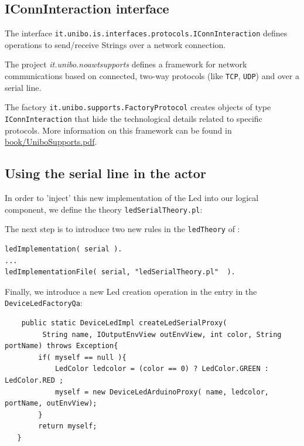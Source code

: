 \subsection{IConnInteraction interface} 
The interface \texttt{it.unibo.is.interfaces.protocols.IConnInteraction} defines operations to send/receive Strings over a  network connection.



The project \textit{it.unibo.noawtsupports} defines a framework for network communications based on connected, two-way protocols (like \texttt{TCP}, \texttt{UDP}) and over a serial line.

The factory \texttt{it.unibo.supports.FactoryProtocol} creates objects of type \texttt{IConnInteraction} that hide the technological details related to specific protocols.  More information on this framework can be found in \href{https://137.204.107.21/syskb/it.unibo.iss2015intro/docs/Readings/UniboSupports/UniboSupports.pdf}{book/UniboSupports.pdf}.

\subsection{Using the serial line in the actor}
In order to 'inject' this new implementation of the Led into our logical component, we define the theory \texttt{ledSerialTheory.pl}:



The next step is to introduce two new rules in  the \texttt{ledTheory} of :

\begin{lstlisting}
ledImplementation( serial ).
...
ledImplementationFile( serial, "ledSerialTheory.pl"  ).
\end{lstlisting}

Finally, we introduce a new Led creation operation in the entry in the \texttt{DeviceLedFactoryQa}:
\begin{lstlisting}
    public static DeviceLedImpl createLedSerialProxy( 
   		 String name, IOutputEnvView outEnvView, int color, String portName) throws Exception{
       	if( myself == null ){
       		LedColor ledcolor = (color == 0) ? LedColor.GREEN : LedColor.RED ;
 	  		myself = new DeviceLedArduinoProxy( name, ledcolor, portName, outEnvView);  				 
  		}
       	return myself;
   }
\end{lstlisting}

